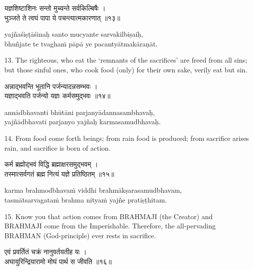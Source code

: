 \begin{gitaverse}
यज्ञशिष्टाशिनः सन्तो मुच्यन्ते सर्वकिल्बिषैः । \\
भुञ्जते ते त्वघं पापा ये पचन्त्यात्मकारणात् ॥१३॥
\end{gitaverse}

\begin{transliteration}
yajñaśiṣṭāśinaḥ santo mucyante sarvakilbiṣaiḥ, \\
bhuñjate te tvaghaṁ pāpā ye pacantyātmakāraṇāt.
\end{transliteration}

13. The righteous, who eat the `remnants of the sacrifices' are freed from all
sins; but those sinful ones, who cook food (only) for their own sake, verily
eat but sin.

\begin{gitaverse}
अन्नाद्भवन्ति भूतानि पर्जन्यादन्नसम्भवः । \\
यज्ञाद्भवति पर्जन्यो यज्ञः कर्मसमुद्भवः ॥१४॥
\end{gitaverse}

\begin{transliteration}
annādbhavanti bhūtāni parjanyādannasambhavaḥ, \\
yajñādbhavati parjanyo yajñaḥ karmasamudbhavaḥ.
\end{transliteration}

14. From food come forth beings; from rain food is produced; from sacrifice
arises rain, and sacrifice is born of action.

\begin{gitaverse}
कर्म ब्रह्मोद्भवं विद्धि ब्रह्माक्षरसमुद्भवम् । \\
तस्मात्सर्वगतं ब्रह्म नित्यं यज्ञे प्रतिष्ठितम् ॥१५॥
\end{gitaverse}

\begin{transliteration}
karma brahmodbhavaṁ viddhi brahmākṣarasamudbhavam, \\
tasmātsarvagataṁ brahma nityaṁ yajñe pratiṣṭhitam.
\end{transliteration}

15. Know you that action comes from BRAHMAJI (the Creator) and BRAHMAJI come
from the Imperishable. Therefore, the all-pervading BRAHMAN (God-principle)
ever rests in sacrifice.

\begin{gitaverse}
एवं प्रवर्तितं चक्रं नानुवर्तयतीह यः । \\
अघायुरिन्द्रियारामो मोघं पार्थ स जीवति ॥१६॥
\end{gitaverse}

